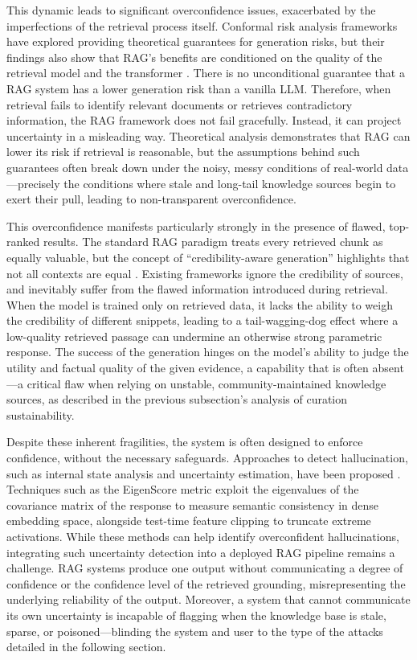 \documentclass[11pt]{article}
\begin{document}
This dynamic leads to significant overconfidence issues, exacerbated by the imperfections of the retrieval process itself. Conformal risk analysis frameworks have explored providing theoretical guarantees for generation risks, but their findings also show that RAG's benefits are conditioned on the quality of the retrieval model and the transformer \cite{ref135}. There is no unconditional guarantee that a RAG system has a lower generation risk than a vanilla LLM. Therefore, when retrieval fails to identify relevant documents or retrieves contradictory information, the RAG framework does not fail gracefully. Instead, it can project uncertainty in a misleading way. Theoretical analysis demonstrates that RAG can lower its risk if retrieval is reasonable, but the assumptions behind such guarantees often break down under the noisy, messy conditions of real-world data---precisely the conditions where stale and long-tail knowledge sources begin to exert their pull, leading to non-transparent overconfidence.

This overconfidence manifests particularly strongly in the presence of flawed, top-ranked results. The standard RAG paradigm treats every retrieved chunk as equally valuable, but the concept of ``credibility-aware generation'' highlights that not all contexts are equal \cite{ref239}. Existing frameworks ignore the credibility of sources, and inevitably suffer from the flawed information introduced during retrieval. When the model is trained only on retrieved data, it lacks the ability to weigh the credibility of different snippets, leading to a tail-wagging-dog effect where a low-quality retrieved passage can undermine an otherwise strong parametric response. The success of the generation hinges on the model's ability to judge the utility and factual quality of the given evidence, a capability that is often absent---a critical flaw when relying on unstable, community-maintained knowledge sources, as described in the previous subsection's analysis of curation sustainability.

Despite these inherent fragilities, the system is often designed to enforce confidence, without the necessary safeguards. Approaches to detect hallucination, such as internal state analysis and uncertainty estimation, have been proposed \cite{ref134}. Techniques such as the EigenScore metric exploit the eigenvalues of the covariance matrix of the response to measure semantic consistency in dense embedding space, alongside test-time feature clipping to truncate extreme activations. While these methods can help identify overconfident hallucinations, integrating such uncertainty detection into a deployed RAG pipeline remains a challenge. RAG systems produce one output without communicating a degree of confidence or the confidence level of the retrieved grounding, misrepresenting the underlying reliability of the output. Moreover, a system that cannot communicate its own uncertainty is incapable of flagging when the knowledge base is stale, sparse, or poisoned---blinding the system and user to the type of the attacks detailed in the following section.
\end{document}
